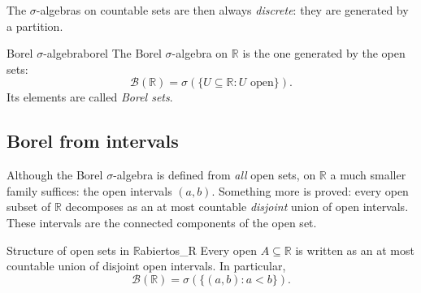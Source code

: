 \documentclass[11pt, a4paper]{article}
\begin{document}
\obs The $\sigma$-algebras on countable sets are then always \emph{discrete}: they
are generated by a partition.

\begin{definicion}{Borel $\sigma$-algebra}{borel}
The Borel $\sigma$-algebra on $\mathbb{R}$ is the one generated by the open sets:
$$ \mathcal{B}(\mathbb{R}) = \sigma(\{U \subseteq \mathbb{R} : U \text{ open}\}). $$
Its elements are called \emph{Borel sets}.
\end{definicion}

\subsection{Borel from intervals}

Although the Borel $\sigma$-algebra is defined from \emph{all} open sets, on
$\mathbb{R}$ a much smaller family suffices: the open intervals $(a, b)$. Something more is proved:
every open subset of $\mathbb{R}$ decomposes as an at most countable \emph{disjoint} union of
open intervals. These intervals are the connected components of the open set.

\begin{proposicion}{Structure of open sets in $\mathbb{R}$}{abiertos_R}
Every open $A \subseteq \mathbb{R}$ is written as an at most countable union of disjoint open
intervals. In particular,
$$ \mathcal{B}(\mathbb{R}) = \sigma(\{(a, b) : a < b\}). $$
\end{proposicion}
\end{document}
